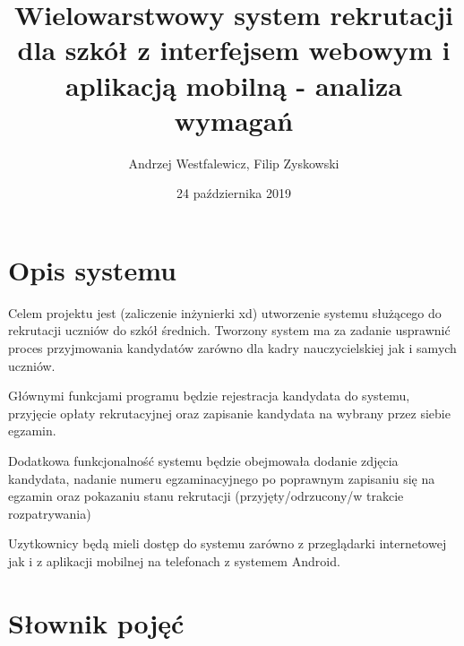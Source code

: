 \documentclass{article}
\title{Wielowarstwowy system rekrutacji dla szkół z interfejsem webowym i aplikacją mobilną - analiza wymagań}
\author{Andrzej Westfalewicz, Filip Zyskowski}
\date{24 października 2019}
\begin{document}
\begin{titlepage}
\maketitle
\end{titlepage}

\tableofcontents

\section{Opis systemu}

Celem projektu jest (zaliczenie inżynierki xd) utworzenie systemu służącego do rekrutacji uczniów do szkół średnich. Tworzony system ma za zadanie usprawnić proces przyjmowania kandydatów zarówno dla kadry nauczycielskiej jak i samych uczniów.

Głównymi funkcjami programu będzie rejestracja kandydata do systemu, przyjęcie opłaty rekrutacyjnej oraz zapisanie kandydata na wybrany przez siebie egzamin.

Dodatkowa funkcjonalność systemu będzie obejmowała dodanie zdjęcia kandydata, nadanie numeru egzaminacyjnego po poprawnym zapisaniu się na egzamin oraz pokazaniu stanu rekrutacji (przyjęty/odrzucony/w trakcie rozpatrywania)

Uzytkownicy będą mieli dostęp do systemu zarówno z przeglądarki internetowej jak i z aplikacji mobilnej na telefonach z systemem Android.

\section{Słownik pojęć}
\end{document}
